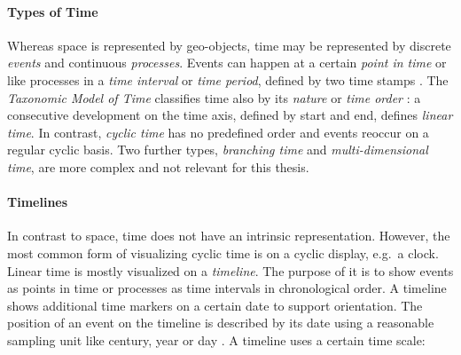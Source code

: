 \paragraph{Types of Time} %
\label{par:types_of_time}

Whereas space is represented by geo-objects, time may be represented by discrete \emph{events} and continuous \emph{processes}. Events can happen at a certain \emph{point in time} or like processes in a \emph{time interval} or \emph{time period}, defined by two time stamps
\cite[chapter 2, pp. 47-49]{solana2014spatio}.
The \emph{Taxonomic Model of Time} classifies time also by its \emph{nature} or \emph{time order}
\cite{frank98typesoftime}:
a consecutive development on the time axis, defined by start and end, defines \emph{linear time}. In contrast, \emph{cyclic time} has no predefined order and events reoccur on a regular cyclic basis. Two further types, \emph{branching time} and \emph{multi-dimensional time}, are more complex and not relevant for this thesis.



\paragraph{Timelines} %
\label{sub:timelines}

In contrast to space, time does not have an intrinsic representation. However, the most common form of visualizing cyclic time is on a cyclic display, e.g.\ a  clock. Linear time is mostly visualized on a \emph{timeline}. The purpose of it is to show events as points in time or processes as time intervals in chronological order. A timeline shows additional time markers on a certain date to support orientation. The position of an event on the timeline is described by its date using a reasonable sampling unit like century, year or day
\cite[p. 32]{Langran1989timeingis}.
A timeline uses a certain time scale:

